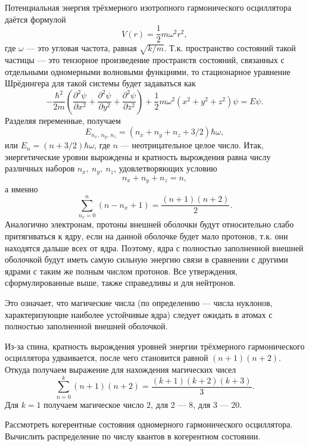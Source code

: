 \documentclass[a4paper]{article}
\begin{document}
\begin{sol}
Потенциальная энергия трёхмерного изотропного гармонического
осциллятора даётся формулой
\[
	V(r)= \frac{1}{2}m \omega^2 r^2
 ,\]
где $\omega$ --- это угловая частота, равная $\sqrt{k /m} $.
Т.\:к. пространство состояний такой частицы --- это тензорное
произведение пространств состояний, связанных с отдельными
одномерными волновыми функциями, то стационарное уравнение
Шрёдингера для такой системы будет задаваться как
\[
	-\frac{\hbar^2}{2m} \left( \frac{\partial ^2 \psi}{\partial x^2} +\frac{\partial ^2\psi}{\partial y^2} +\frac{\partial ^2\psi}{\partial z^2}  \right) +\frac{1}{2}m \omega^2 (x^2+y^2+z^2)\psi=E\psi
.\] 
Разделяя переменные, получаем
\[
	E_{n_x,\,n_{y},\,n_z}= (n_x+n_y+n_z+ 3 /2) \hbar \omega
,\]
или $E_n=(n+3 /2)\hbar\omega$, где $n$ --- неотрицательное
целое число. Итак, энергетические уровни вырождены и кратность
вырождения равна числу различных наборов $n_x,\ n_y,\ n_z$,
удовлетворяющих условию
\[
n_x+n_y+n_z=n
 ,\] 
а именно
\[
	\sum_{n_x=0}^{n} (n-n_x+1)=\frac{(n+1)(n+2)}{2}
.\] 
Аналогично электронам, протоны внешней оболочки будут
относительно слабо притягиваться к ядру, если на данной
оболочке будет мало протонов, т.\:к. они находятся дальше
всех от ядра. Поэтому, ядра с полностью заполненной внешней
оболочкой будут иметь самую сильную энергию связи в сравнении
с другими ядрами с таким же полным числом протонов. Все
утверждения, сформулированные выше, также справедливы и для
нейтронов.

Это означает, что магические числа (по определению --- числа нуклонов, характеризующие
наиболее устойчивые ядра) следует ожидать в атомах с полностью
заполненной внешней оболочкой.

Из-за спина, кратность вырождения уровней энергии трёхмерного
гармонического осциллятора удваивается, после чего становится
равной $(n+1)(n+2)$. Откуда получаем выражение для нахождения
магических чисел
\[
	\sum_{n=0}^{k} (n+1)(n+2)= \frac{(k+1)(k+2)(k+3)}{3}
.\] 
Для $k=1$ получаем магическое число $2$, для 2 --- 8, для 3 ---
20.
\end{sol}
\begin{problem}
Рассмотреть когерентные состояния одномерного гармонического
осциллятора. Вычислить распределение по числу квантов
в когерентном состоянии.
\end{problem}
\end{document}

